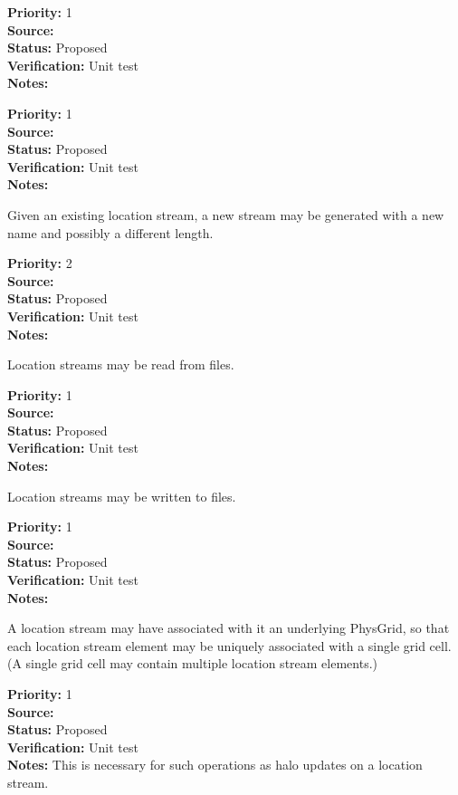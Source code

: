 \begin{reqlist}
{\bf Priority:} 1 \\
{\bf Source:} \\
{\bf Status:} Proposed \\
{\bf Verification:} Unit test \\
{\bf Notes:} 
\end{reqlist}

\begin{reqlist}
{\bf Priority:} 1 \\
{\bf Source:} \\
{\bf Status:} Proposed \\
{\bf Verification:} Unit test \\
{\bf Notes:} 
\end{reqlist}

Given an existing location stream, a new stream may be generated with a new name and
possibly a different length.
\begin{reqlist}
{\bf Priority:} 2 \\
{\bf Source:} \\
{\bf Status:} Proposed \\
{\bf Verification:} Unit test \\
{\bf Notes:} 
\end{reqlist}

Location streams may be read from files.
\begin{reqlist}
{\bf Priority:} 1 \\
{\bf Source:} \\
{\bf Status:} Proposed \\
{\bf Verification:} Unit test \\
{\bf Notes:} 
\end{reqlist}

Location streams may be written to files.
\begin{reqlist}
{\bf Priority:} 1 \\
{\bf Source:} \\
{\bf Status:} Proposed \\
{\bf Verification:} Unit test \\
{\bf Notes:} 
\end{reqlist}

A location stream may have associated with it an underlying PhysGrid, so that each
location stream element may be uniquely associated with a single grid cell. (A single
grid cell may contain multiple location stream elements.)
\begin{reqlist}
{\bf Priority:} 1 \\
{\bf Source:} \\
{\bf Status:} Proposed \\
{\bf Verification:} Unit test \\
{\bf Notes:} This is necessary for such operations as halo updates on a location
stream.
\end{reqlist}

